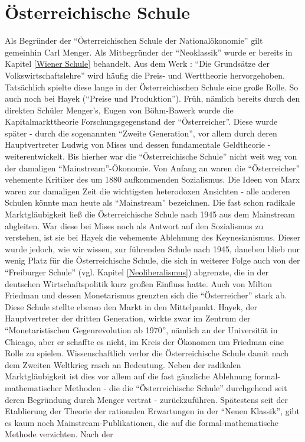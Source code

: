 %
%
%

\chapter{Österreichische Schule}
\label{Austria}

Als Begründer der "`Österreichischen Schule der Nationalökonomie"' gilt gemeinhin Carl Menger. Als Mitbegründer der "`Neoklassik"' wurde er bereits in Kapitel \ref{Wiener Schule} behandelt. Aus dem Werk \textcite{Menger1871}: "`Die Grundsätze der Volkswirtschaftslehre"' wird häufig die Preis- und Werttheorie hervorgehoben. Tatsächlich spielte diese lange in der Österreichischen Schule eine große Rolle. So auch noch bei Hayek ("`Preise und Produktion"'). Früh, nämlich bereits durch den direkten Schüler Menger's, Eugen von Böhm-Bawerk wurde die Kapitalmarkttheorie Forschungsgegenstand der "`Österreicher"'. Diese wurde später - durch die sogenannten "`Zweite Generation"', vor allem durch deren Hauptvertreter Ludwig von Mises und dessen fundamentale Geldtheorie - weiterentwickelt. Bis hierher war die "`Österreichische Schule"' nicht weit weg von der damaligen "`Mainstream"'-Ökonomie. Von Anfang an waren die "`Österreicher"' vehemente Kritiker des um 1880 aufkommenden Sozialismus. Die Ideen von Marx waren zur damaligen Zeit die wichtigsten heterodoxen Ansichten - alle anderen Schulen könnte man heute als "`Mainstream"' bezeichnen. Die fast schon radikale Marktgläubigkeit ließ die Österreichische Schule nach 1945 aus dem Mainstream abgleiten. War diese bei Mises noch als Antwort auf den Sozialismus zu verstehen, ist sie bei Hayek die vehemente Ablehnung des Keynesianismus. Dieser wurde jedoch, wie wir wissen, zur führenden Schule nach 1945, daneben blieb nur wenig Platz für die Österreichische Schule, die sich in weiterer Folge auch von der "`Freiburger Schule"' (vgl. Kapitel \ref{Neoliberalismus}) abgrenzte, die in der deutschen Wirtschaftspolitik kurz großen Einfluss hatte. Auch von Milton Friedman und dessen Monetarismus grenzten sich die "`Österreicher"' stark ab. Diese Schule stellte ebenso den Markt in den Mittelpunkt. Hayek, der Hauptvertreter der dritten Generation, wirkte zwar im Zentrum der "`Monetaristischen Gegenrevolution ab 1970"', nämlich an der Universität in Chicago, aber er schaffte es nicht, im Kreis der Ökonomen um Friedman eine Rolle zu spielen. Wissenschaftlich verlor die Österreichische Schule damit nach dem Zweiten Weltkrieg rasch an Bedeutung. Neben der radikalen Marktgläubigkeit ist dies vor allem auf die fast gänzliche Ablehnung formal-mathematischer Methoden - die die "`Österreichische Schule"' durchgehend seit deren Begründung durch Menger vertrat - zurückzuführen. Spätestens seit der Etablierung der Theorie der rationalen Erwartungen in der "`Neuen Klassik"', gibt es kaum noch Mainstream-Publikationen, die auf die formal-mathematische Methode verzichten. Nach der 